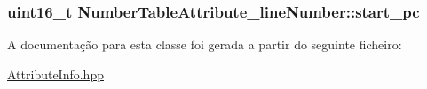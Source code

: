 \subsubsection[{\texorpdfstring{start\+\_\+pc}{start_pc}}]{\setlength{\rightskip}{0pt plus 5cm}uint16\+\_\+t Number\+Table\+Attribute\+\_\+line\+Number\+::start\+\_\+pc}\hypertarget{class_number_table_attribute__line_number_a2ede9887ca805349c8edc876dbc4d0da}{}\label{class_number_table_attribute__line_number_a2ede9887ca805349c8edc876dbc4d0da}


A documentação para esta classe foi gerada a partir do seguinte ficheiro\+:\begin{DoxyCompactItemize}
\item 
\hyperlink{_attribute_info_8hpp}{Attribute\+Info.\+hpp}\end{DoxyCompactItemize}
